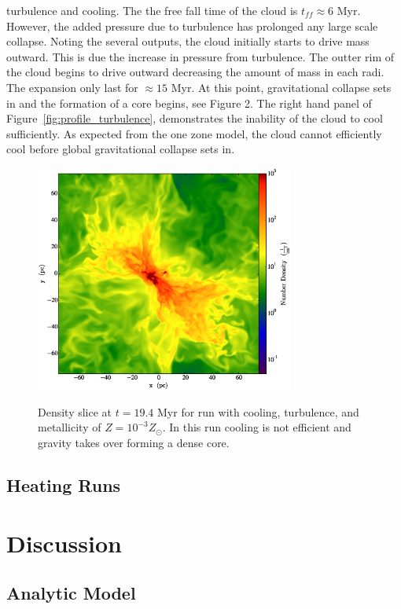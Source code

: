 \documentclass[useAMS,usenatbib]{mn2e}
\begin{document}
turbulence and cooling. The the free fall time of the cloud is $t_{ff}\approx 6$
Myr. However, the added pressure due to turbulence has prolonged any large scale
collapse. Noting the several outputs, the cloud initially starts to drive mass
outward. This is due the increase in pressure from turbulence. The outter rim
of the cloud begins to drive outward decreasing the amount of mass in each radi.
The expansion only last for $\approx 15$ Myr. At this point, gravitational
collapse sets in and the formation of a core begins, see Figure 2. The right
hand panel of Figure~\ref{fig:profile_turbulence}, demonstrates the inability of the cloud to cool
sufficiently. As expected from the one zone model, the cloud cannot efficiently
cool before global gravitational collapse sets in.
\begin{figure}
\begin{center}
\mbox{\includegraphics[width=8.5cm]{Images/density_slice}}
\end{center}
\caption{\label{fig:slice_turbulence}} Density slice at $t=19.4$ Myr for run with
cooling, turbulence, and metallicity of $Z=10^{-3}Z_\odot$. In this run cooling is
not efficient and gravity takes over forming a dense core. 
\end{figure}

 
\subsection{Heating Runs}

% 
\section{Discussion}
\label{sec:discussion}
\subsection{Analytic Model}
\end{document}
